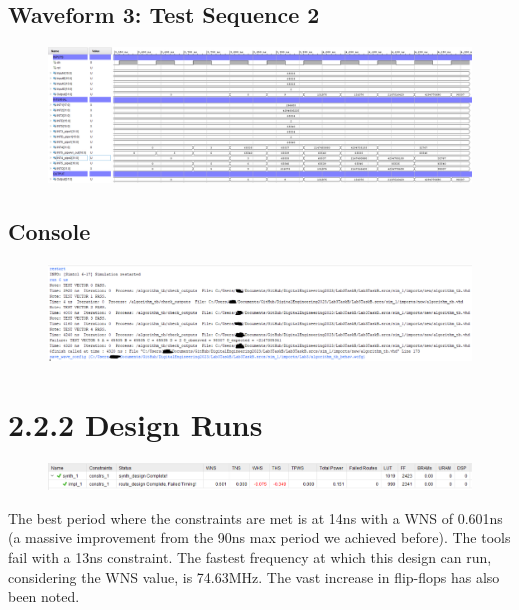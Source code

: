 \documentclass[11pt]{report}
\begin{document}
\subsection*{Waveform 3: Test Sequence 2}
\begin{figure}[H]
    \includegraphics[width=\columnwidth]{Reports/Lab3/Assets/2.2.1_waveform-test-sequence-2.png}
\end{figure}

\subsection*{Console}
\begin{figure}[H]
    \includegraphics[width=\columnwidth]{Reports/Lab3/Assets/2.2.1_console.png}
\end{figure}

\section*{2.2.2 Design Runs}
\begin{figure}[H]
    \includegraphics[width=\columnwidth]{Reports/Lab3/Assets/2.2.2_design-runs.png}
\end{figure}
The best period where the constraints are met is at 14ns with a WNS of 0.601ns (a massive improvement from the 90ns max period we achieved before). The tools fail with a 13ns constraint. The fastest frequency at which this design can run, considering the WNS value, is 74.63MHz. The vast increase in flip-flops has also been noted.
\end{document}
